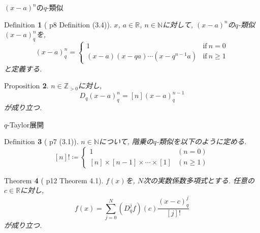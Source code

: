 \documentclass[dvipdfmx,cjk]{beamer}
\theoremstyle{mystyle}
\newtheorem{df}{$\textrm{Definition}$}[section]
\newtheorem{prop}[df]{$\textrm{Proposition}$}
\newtheorem{thm}[df]{$\textrm{Theorem}$}
\newcommand{\N}{\mathbb{N}}
\newcommand{\Z}{\mathbb{Z}}
\newcommand{\R}{\mathbb{R}}
\newcommand{\0}{\textbf{0}}
\begin{document}
\begin{frame}{$(x - a)^n$の$q$-類似} 
	\begin{df}[\cite{Kac} p8 Definition (3.4)]
	  $x$, $a \in \R$, $n \in \N$に対して, $(x - a)^n$の$q$-類似$(x - a)^n_q$を, 
	  \[
	  (x - a)^n_q = \begin{cases}
	                      1 & \text{if}\ n = 0 \\
	                      (x - a) (x - qa) \cdots (x - q^{n - 1} a) & \text{if}\ n \ge 1
	                    \end{cases}
	  \]
	  と定義する. 
	\end{df} \pause
	\begin{prop} \label{Dq_qbinom_nonneg}
	  $n\in\Z_{>0}$に対し, 
	  \[
	    D_q(x-a)^n_q = [n](x-a)^{n-1}_q
	  \]
	  が成り立つ. 
	\end{prop}
\end{frame}

%

\begin{frame}{$q$-Taylor展開}
	\begin{df}[\cite{Kac} p7 (3.1)]
		$n \in \N$について, 階乗の$q$-類似を以下のように定める. 
    \[
      [n]! \coloneqq \begin{cases}
                            1 & (n=0)\\
                            [n]\times[n-1]\times\cdots\times[1] & (n\ge1)
                          \end{cases}
    \]
  \end{df} \pause
  \begin{thm}[\cite{Kac} p12 Theorem 4.1] \label{q_Taylor}
	 $f(x)$を, $N$次の実数係数多項式とする. 任意の$c\in\R$に対し, 
	 \[
	   f(x) = \sum_{j=0}^N (D_q^jf)(c)\frac{(x-c)^j_q}{[j]!}
	 \]
	 が成り立つ. 
  \end{thm}
\end{frame}
\end{document}
